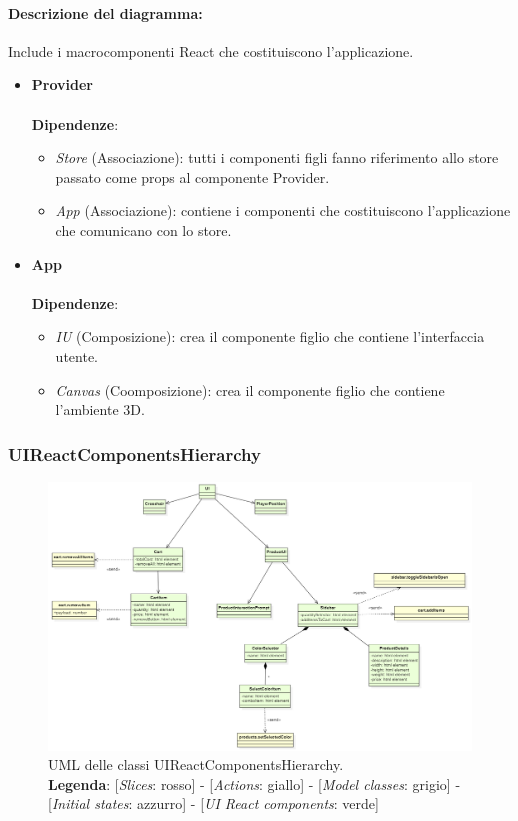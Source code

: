 \paragraph*{Descrizione del diagramma:}
Include i macrocomponenti React che costituiscono l'applicazione.
\begin{itemize}
		\item \textbf{Provider}
		\\\\
		\textbf{Dipendenze}:
		\begin{itemize}
			\item \textit{Store} (Associazione): tutti i componenti figli fanno riferimento allo store passato come props al 
			componente Provider.
			\item \textit{App} (Associazione): contiene i componenti che costituiscono l'applicazione che comunicano con lo store.
		\end{itemize}

		\item \textbf{App}
		\\\\
		\textbf{Dipendenze}:
		\begin{itemize}
			\item \textit{IU} (Composizione): crea il componente figlio che contiene l'interfaccia utente.
			\item \textit{Canvas} (Coomposizione): crea il componente figlio che contiene l'ambiente 3D.
		\end{itemize}
\end{itemize}

		
\begin{landscape}
\thispagestyle{empty}
\subsubsection{UIReactComponentsHierarchy}
\begin{figure}[H]
	\centering
	\includegraphics[scale=0.7, keepaspectratio]{./res/images/UIReactComponentsHierarchy.PNG}
	\caption[UML delle classi UIReactComponentsHierarchy]{
	UML delle classi UIReactComponentsHierarchy.
	\\
	\textbf{Legenda}: 
	[\textit{Slices}: rosso] -
	[\textit{Actions}: giallo] -
	[\textit{Model classes}: grigio] -
	[\textit{Initial states}: azzurro] -
	[\textit{UI React components}: verde]}
\end{figure}
\end{landscape}
\restoregeometry

